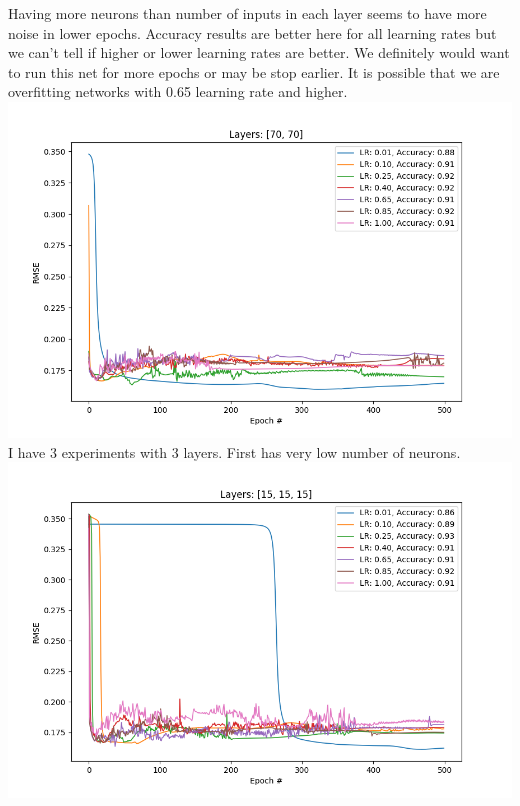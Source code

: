 \documentclass[12pt, letterpaper]{article}
\begin{document}
\begin{enumerate}[label=\Roman*.]
	 Having more neurons than number of inputs in each layer seems to have more noise in lower epochs. Accuracy results are better here for all learning rates but we can't tell if higher or lower learning rates are better. We definitely would want to run this net for more epochs or may be stop earlier. It is possible that we are overfitting networks with 0.65 learning rate and higher. \\
	  {\center \includegraphics[scale=0.7]{../images/rmse_3.png} \\}
	  I have 3 experiments with 3 layers. First has very low number of neurons.
	  {\center \includegraphics[scale=0.7]{../images/rmse_7.png} \\}
	  

\end{enumerate}
\end{document}
